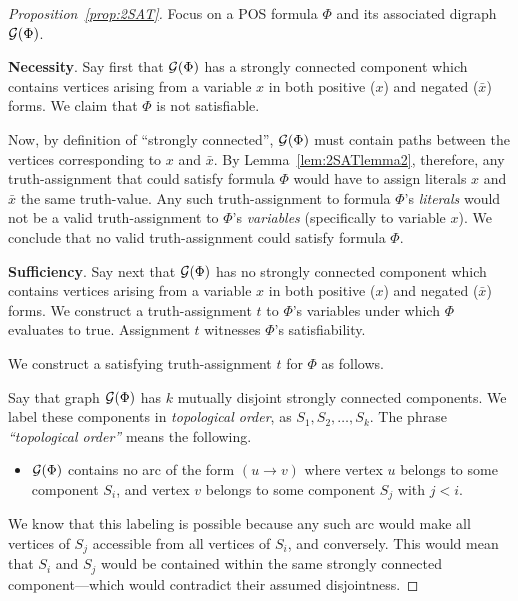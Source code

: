 \begin{proof}[Proposition~\ref{prop:2SAT}]
Focus on a POS formula $\Phi$ and its associated digraph $\mbox{$\cal G$}(\Phi)$.

{\bf Necessity}.
Say first that $\mbox{$\cal G$}(\Phi)$ has a strongly connected component which
contains vertices arising from a variable $x$ in both positive ($x$)
and negated ($\bar{x}$) forms.  We claim that $\Phi$ is not
satisfiable.

Now, by definition of ``strongly connected'', $\mbox{$\cal G$}(\Phi)$ must contain
paths between the vertices corresponding to $x$ and $\bar{x}$.  By
Lemma~\ref{lem:2SATlemma2}, therefore, any truth-assignment that could
satisfy formula $\Phi$ would have to assign literals $x$ and $\bar{x}$
the same truth-value.  Any such truth-assignment to formula $\Phi$'s
{\em literals} would not be a valid truth-assignment to $\Phi$'s {\em
  variables} (specifically to variable $x$).  We conclude that no
valid truth-assignment could satisfy formula $\Phi$.

\medskip

{\bf Sufficiency}.
Say next that $\mbox{$\cal G$}(\Phi)$ has no strongly connected component which
contains vertices arising from a variable $x$ in both positive ($x$)
and negated ($\bar{x}$) forms.  We construct a truth-assignment $t$ to
$\Phi$'s variables under which $\Phi$ evaluates to {\sc true}.
Assignment $t$ witnesses $\Phi$'s satisfiability.

We construct a satisfying truth-assignment $t$ for $\Phi$ as follows.

Say that graph $\mbox{$\cal G$}(\Phi)$ has $k$ mutually disjoint strongly connected
components.  We label these components in {\it topological order},
 as $S_1, S_2, \ldots, S_k$.  The phrase
{\it ``topological order''} means the following.
\begin{itemize}
\item
$\mbox{$\cal G$}(\Phi)$ contains no arc of the form $(u \rightarrow v)$ where
  vertex $u$ belongs to some component $S_i$, and vertex $v$ belongs
  to some component $S_j$ with $j < i$.
\end{itemize}
We know that this labeling is possible because any such arc would make
all vertices of $S_j$ accessible from all vertices of $S_i$, and
conversely.  This would mean that $S_i$ and $S_j$ would be contained
within the same strongly connected component---which would contradict
their assumed disjointness.
\medskip


\end{proof}
